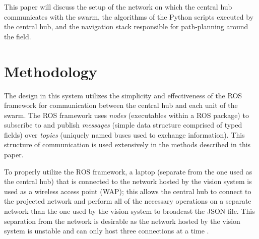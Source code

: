 \documentclass{article}
\begin{document}
     \par This paper will discuss the setup of the network on which the central hub communicates with the swarm, the algorithms of the Python scripts executed by the central hub, and the navigation stack responsible for path-planning around the field.

     \section{Methodology}
     The design in this system utilizes the simplicity and effectiveness of the ROS framework for communication between the central hub and each unit of the swarm. The ROS framework uses \textit{nodes} (executables within a ROS package) to subscribe to and publish \textit{messages} (simple data structure comprised of typed fields) over \textit{topics} (uniquely named buses used to exchange information). This structure of communication is used extensively in the methods described in this paper.

     \par To properly utilize the ROS framework, a laptop (separate from the one used as the central hub) that is connected to the network hosted by the vision system is used as a wireless access point (WAP); this allows the central hub to connect to the projected network and perform all of the necessary operations on a separate network than the one used by the vision system to broadcast the JSON file. This separation from the network is desirable as the network hosted by the vision system is unstable and can only host three connections at a time \cite{ProjectDescription}.
\end{document}
